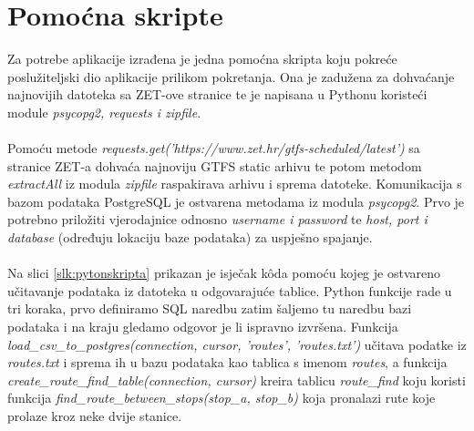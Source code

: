 \documentclass[zavrsnirad]{fer}
\begin{document}
\section{Pomoćna skripte}
\label{sec:skripta}
Za potrebe aplikacije izrađena je jedna pomoćna skripta koju pokreće poslužiteljski dio aplikacije prilikom pokretanja. Ona je zadužena za dohvaćanje najnovijih datoteka sa ZET-ove stranice te je napisana u Pythonu koristeći module \textit{psycopg2, requests i zipfile}.\\\\
Pomoću metode \textit{requests.get('https://www.zet.hr/gtfs-scheduled/latest')} sa stranice ZET-a dohvaća najnoviju GTFS static arhivu te potom metodom \textit{extractAll} iz modula \textit{zipfile} raspakirava arhivu i sprema datoteke. Komunikacija s bazom podataka PostgreSQL je ostvarena metodama iz modula \textit{psycopg2}. Prvo je potrebno priložiti vjerodajnice odnosno \textit{username i password} te \textit{host, port i database} (određuju lokaciju baze podataka) za uspješno spajanje.\\\\
Na slici \ref{slk:pytonskripta} prikazan je isječak k\^oda pomoću kojeg je ostvareno učitavanje podataka iz datoteka u odgovarajuće tablice. Python funkcije rade u tri koraka, prvo definiramo SQL naredbu zatim šaljemo tu naredbu bazi podataka i na kraju gledamo odgovor je li ispravno izvršena. Funkcija \textit{load\_csv\_to\_postgres(connection, cursor, 'routes', 'routes.txt')} učitava podatke iz \textit{routes.txt}  i sprema ih u bazu podataka kao tablica s imenom \textit{routes}, a funkcija \textit{create\_route\_find\_table(connection, cursor)} kreira tablicu \textit{route\_find} koju koristi funkcija \textit{find\_route\_between\_stops(stop\_a, stop\_b)} koja pronalazi rute koje prolaze kroz neke dvije stanice.
\end{document}
